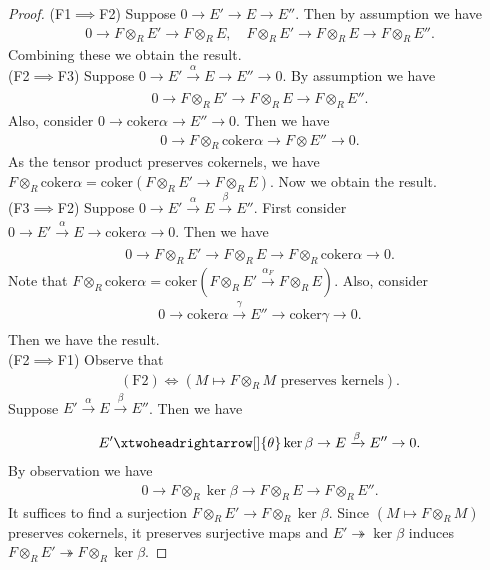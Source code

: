 \documentclass[12pt]{report}
\theoremstyle{plain}
\theoremstyle{remark}
\theoremstyle{definition}
\begin{document}
\begin{proof}
    (F1$\implies$F2) Suppose $0\to E'\to E\to E''$. Then by assumption we have
    \begin{align*}
        0\to F\otimes_R E'\to F\otimes_R E,\quad F\otimes_R E'\to F\otimes_R E\to F\otimes_R E''.
    \end{align*}
    Combining these we obtain the result.\\
    (F2$\implies$F3) Suppose $0\to E'\xrightarrow[]{\alpha} E\to E''\to 0$. By assumption we have
    \begin{align*}
        0\to F\otimes_R E' \to F\otimes_R E \to F\otimes_R E''.
    \end{align*}
    Also, consider $0\to \mathrm{coker}\alpha\to E''\to 0$. Then we have
    \begin{align*}
        0\to F\otimes_R \mathrm{coker}\alpha \to F\otimes E''\to 0.
    \end{align*}
    As the tensor product preserves cokernels, we have $F\otimes_R \mathrm{coker}\alpha=\mathrm{coker}(F\otimes_R E'\to F\otimes_R E)$. Now we obtain the result.\\
    (F3$\implies$F2) Suppose $0\to E'\xrightarrow[]{\alpha}E\xrightarrow[]{\beta}E''$. First consider $0\to E'\xrightarrow[]{\alpha}E\to\mathrm{coker}\alpha\to 0$. Then we have
    \begin{align*}
        0\to F\otimes_R E'\to F\otimes_R E\to F\otimes_R \mathrm{coker}\alpha\to 0.
    \end{align*}
    Note that $F\otimes_R\mathrm{coker}\alpha=\mathrm{coker}(F\otimes_R E'\xrightarrow[]{\alpha_F}F\otimes_R E)$. Also, consider
    \begin{align*}
        0\to \mathrm{coker}\alpha\xrightarrow[]{\gamma} E''\to \mathrm{coker}\gamma\to 0.
    \end{align*}
    Then we have the result.\\
    (F2$\implies$F1) Observe that
    \begin{align*}
        (\mathrm{F2}) \iff (M\mapsto F\otimes_R M\text{ preserves kernels}).
    \end{align*}
    Suppose $E'\xrightarrow[]{\alpha}E\xrightarrow[]{\beta}E''$. Then we have
    \begin{align*}
        E'\xtwoheadrightarrow[]{\theta} \ker\beta\to E\xrightarrow[]{\beta}E'' \to 0.
    \end{align*}
    By observation we have
    \begin{align*}
        0\to F\otimes_R \ker\beta\to F\otimes_R E\to F\otimes_R E''.
    \end{align*}
    It suffices to find a surjection $F\otimes_R E'\to F\otimes_R \ker\beta$. Since $(M\mapsto F\otimes_R M)$ preserves cokernels, it preserves surjective maps and $E'\twoheadrightarrow\ker\beta$ induces $F\otimes_R E'\twoheadrightarrow F\otimes_R \ker\beta$.
\end{proof}
\end{document}

